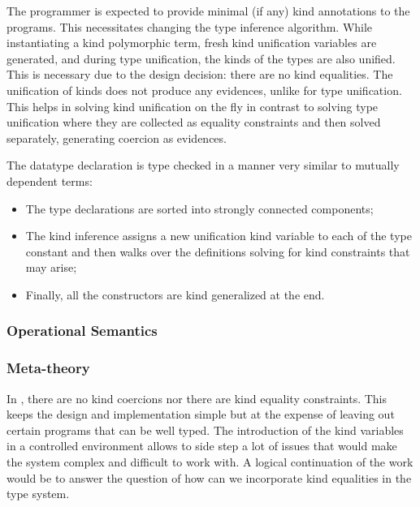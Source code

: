 \documentclass[screen,nonacm]{acmart}
\begin{document}
The programmer is expected to provide minimal (if any) kind annotations to the programs. This necessitates changing the type inference algorithm. While instantiating a kind polymorphic term, fresh kind unification variables are generated, and during type unification, the kinds of the types are also unified. This is necessary due to the design decision: there are no kind equalities. The unification of kinds does not produce any evidences, unlike for type unification. This helps in solving kind unification on the fly in contrast to solving type unification where they are collected as equality constraints and then solved separately, generating coercion as evidences.


The datatype declaration is type checked in a manner very similar to mutually dependent terms:
\begin{itemize}
\item The type declarations are sorted into strongly connected components;
\item The kind inference assigns a new unification kind variable to each of the type constant and then walks over the definitions solving for kind constraints that may arise;
\item Finally, all the constructors are kind generalized at the end.
\end{itemize}

\subsubsection{Operational Semantics}\label{sec:sfp-opsem}

\subsubsection{Meta-theory}\label{sec:sfp-metatheory}

In \SFP, there are no kind coercions nor there are kind equality
constraints. This keeps the design and implementation simple but at
the expense of leaving out certain programs that can be well
typed. The introduction of the kind variables in a controlled environment allows to
side step a lot of issues that would make the system complex and difficult to work with.
A logical continuation of the work would be to answer the
question of how can we incorporate kind equalities in the type system.
\end{document}

